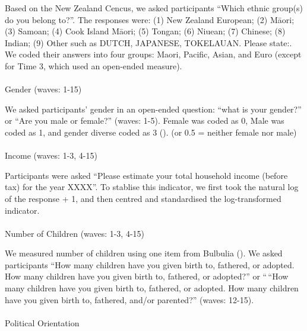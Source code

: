 \documentclass[
  singlecolumn,
  9pt]{scrartcl}
\makeatletter
\let\oldparagraph\paragraph
\renewcommand{\paragraph}{
    \@ifstar
      \xxxParagraphStar
      \xxxParagraphNoStar
  }
\newcommand{\xxxParagraphStar}[1]{\oldparagraph*{#1}\mbox{}}
\newcommand{\xxxParagraphNoStar}[1]{\oldparagraph{#1}\mbox{}}
\makeatother
\begin{document}
Based on the New Zealand Cencus, we asked participants ``Which ethnic
group(s) do you belong to?''. The responses were: (1) New Zealand
European; (2) Māori; (3) Samoan; (4) Cook Island Māori; (5) Tongan; (6)
Niuean; (7) Chinese; (8) Indian; (9) Other such as DUTCH, JAPANESE,
TOKELAUAN. Please state:. We coded their answers into four groups:
Maori, Pacific, Asian, and Euro (except for Time 3, which used an
open-ended measure).

\paragraph{Gender (waves: 1-15)}\label{gender-waves-1-15}

We asked participants' gender in an open-ended question: ``what is your
gender?'' or ``Are you male or female?'' (waves: 1-5). Female was coded
as 0, Male was coded as 1, and gender diverse coded as 3
(). (or 0.5
= neither female nor male)

\paragraph{Income (waves: 1-3, 4-15)}\label{income-waves-1-3-4-15}

Participants were asked ``Please estimate your total household income
(before tax) for the year XXXX''. To stablise this indicator, we first
took the natural log of the response + 1, and then centred and
standardised the log-transformed indicator.

\paragraph{Number of Children (waves: 1-3,
4-15)}\label{number-of-children-waves-1-3-4-15}

We measured number of children using one item from Bulbulia
(). We asked participants ``How many
children have you given birth to, fathered, or adopted. How many
children have you given birth to, fathered, or adopted?'' or ``\,``How
many children have you given birth to, fathered, or adopted. How many
children have you given birth to, fathered, and/or parented?'' (waves:
12-15).

\paragraph{Political Orientation}\label{political-orientation}
\end{document}
